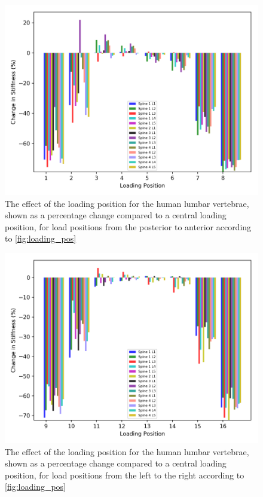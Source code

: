 \begin{figure}[ht!]
\centering
\includegraphics[width=\textwidth]{Chapters/Chapter_HT_images/hum_ap.png}
\caption{The effect of the loading position for the human lumbar vertebrae, shown as a percentage change compared to a central loading position, for load positions from the posterior to anterior according to \cref{fig:loading_pos}}
\label{fig:hum_load_ap}
\end{figure}

\begin{figure}[ht!]
\centering
\includegraphics[width=\textwidth]{Chapters/Chapter_HT_images/hum_lr.png}
\caption{The effect of the loading position for the human lumbar vertebrae, shown as a percentage change compared to a central loading position, for load positions from the left to the right according to \cref{fig:loading_pos}}
\label{fig:hum_load_lr}
\end{figure}



